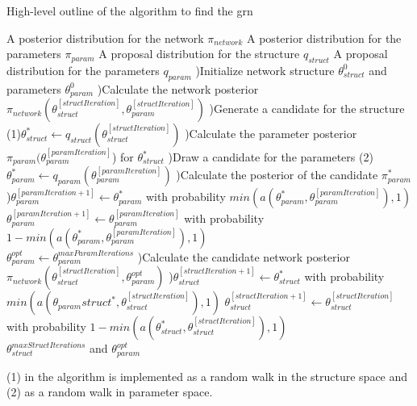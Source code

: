 \begin{algorithm}
\label{alg:find_grn}
\caption{High-level outline of the algorithm to find the grn}
\begin{algorithmic}
  \Require A posterior distribution for the network $\pi_{network}$
  \Require A posterior distribution for the parameters $\pi_{param}$
  \Require A proposal distribution for the structure $q_{struct}$
  \Require A proposal distribution for the parameters $q_{param}$
  )Initialize network structure $\theta_{struct}^0$ and parameters $\theta_{param}^0$
  )Calculate the network posterior $\pi_{network}(\theta_{struct}^{[structIteration]}, \theta_{param}^{[structIteration]})$ 
  )Generate a candidate for the structure (1)$\theta_{struct}^{*} \leftarrow q_{struct}(\theta_{struct}^{[structIteration]})$
  )Calculate the parameter posterior $\pi_{param}(\theta_{param}^{[paramIteration]}$) for $\theta_{struct}^{*}$
  )Draw a candidate for the parameters 
  \State (2)$\theta_{param}^{*} \leftarrow q_{param}(\theta_{param}^{[paramIteration]})$
  )Calculate the posterior of the candidate $\pi_{param}^{*}$
  )$\theta_{param}^{[paramIteration+1]} \leftarrow \theta_{param}^{*} $ 
\State with probability $min({a(\theta_{param}^{*}, \theta_{param}^{[paramIteration]}), 1})$ 
\State   $\theta_{param}^{[paramIteration+1]} \leftarrow \theta_{param}^{[paramIteration]} $ 
\State  with probability $ 1 - min({a(\theta_{param}^{*}, \theta_{param}^{[paramIteration]}), 1})$ 
  \EndFor \\
  \State $\theta_{param}^{opt} \leftarrow \theta_{param}^{maxParamIterations}$
  )Calculate the candidate network posterior 
\State $\pi_{network}(\theta_{struct}^{[structIteration]}, \theta_{param}^{opt})$ 
  )$\theta_{struct}^{[structIteration+1]} \leftarrow \theta_{struct}^{*} $ 
\State with probability $min({a(\theta_{param}struct^{*}, \theta_{struct}^{[structIteration]}), 1})$ 
\State  $\theta_{struct}^{[structIteration+1]} \leftarrow \theta_{struct}^{[structIteration]} $ 
\State with probability $ 1 - min({a(\theta_{struct}^{*}, \theta_{struct}^{[structIteration]}), 1})$
  \EndFor \\
  \Return $\theta_{struct}^{maxStructIterations}$ and $\theta_{param}^{opt}$
  \EndFunction
\end{algorithmic}
\end{algorithm}
(1) in the algorithm is implemented as a random walk in the structure space and (2) as a random walk in parameter space.
